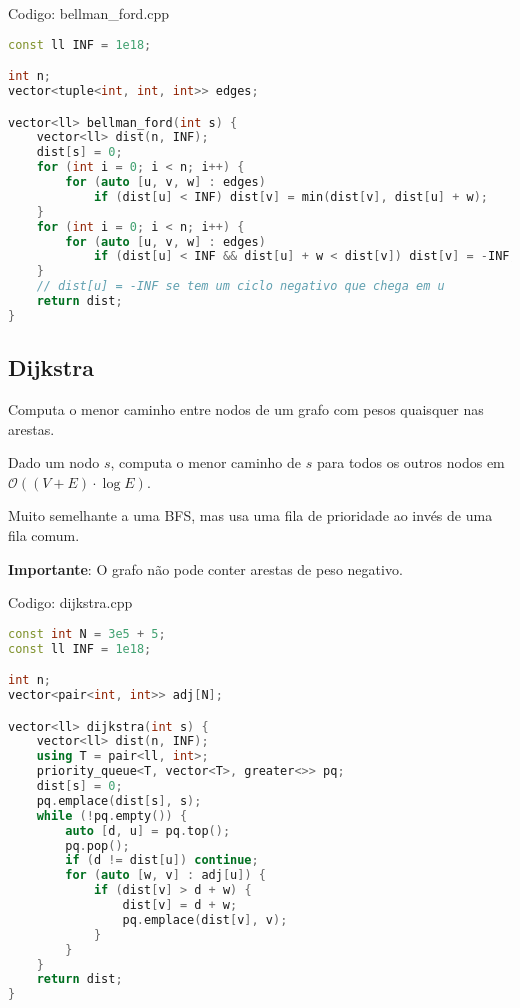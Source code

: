 \documentclass[10pt, a4paper, oneside]{book}
\begin{document}
\hfill

Codigo: bellman\_ford.cpp

\begin{lstlisting}[language=C++]
const ll INF = 1e18;

int n;
vector<tuple<int, int, int>> edges;

vector<ll> bellman_ford(int s) {
    vector<ll> dist(n, INF);
    dist[s] = 0;
    for (int i = 0; i < n; i++) {
        for (auto [u, v, w] : edges)
            if (dist[u] < INF) dist[v] = min(dist[v], dist[u] + w);
    }
    for (int i = 0; i < n; i++) {
        for (auto [u, v, w] : edges)
            if (dist[u] < INF && dist[u] + w < dist[v]) dist[v] = -INF;
    }
    // dist[u] = -INF se tem um ciclo negativo que chega em u
    return dist;
}
\end{lstlisting}
\hfill

\subsection{Dijkstra}


Computa o menor caminho entre nodos de um grafo com pesos quaisquer nas arestas.



Dado um nodo $s$, computa o menor caminho de $s$ para todos os outros nodos em $\mathcal{O}((V + E) \cdot \log E)$.



Muito semelhante a uma BFS, mas usa uma fila de prioridade ao invés de uma fila comum.



\textbf{Importante}: O grafo não pode conter arestas de peso negativo.
\hfill

Codigo: dijkstra.cpp

\begin{lstlisting}[language=C++]
const int N = 3e5 + 5;
const ll INF = 1e18;

int n;
vector<pair<int, int>> adj[N];

vector<ll> dijkstra(int s) {
    vector<ll> dist(n, INF);
    using T = pair<ll, int>;
    priority_queue<T, vector<T>, greater<>> pq;
    dist[s] = 0;
    pq.emplace(dist[s], s);
    while (!pq.empty()) {
        auto [d, u] = pq.top();
        pq.pop();
        if (d != dist[u]) continue;
        for (auto [w, v] : adj[u]) {
            if (dist[v] > d + w) {
                dist[v] = d + w;
                pq.emplace(dist[v], v);
            }
        }
    }
    return dist;
}
\end{lstlisting}
\hfill
\end{document}
